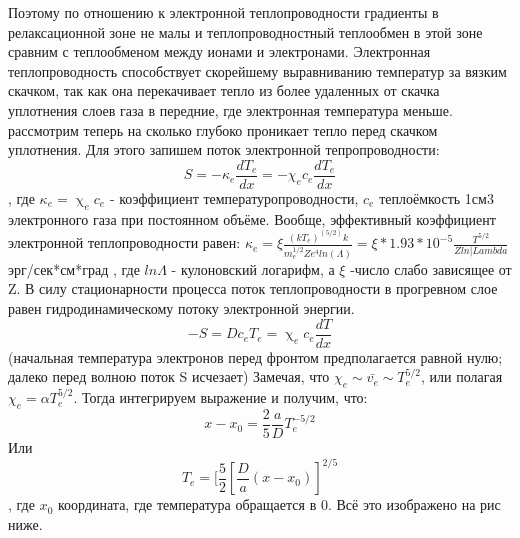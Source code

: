 \documentclass[10pt, a4paper]{article}
\numberwithin{equation}{section}
\begin{document}
Поэтому по отношению к электронной теплопроводности градиенты в релаксационной зоне не малы и теплопроводностный теплообмен в этой зоне сравним с теплообменом между ионами и электронами. Электронная теплопроводность способствует скорейшему выравниванию температур за вязким скачком, так как она перекачивает тепло из более удаленных от скачка уплотнения слоев газа в передние, где электронная температура меньше. 
рассмотрим теперь на сколько глубоко проникает тепло перед скачком уплотнения.
Для этого запишем поток электронной тепропроводности:
\begin{equation}
	S=-\kappa_e \frac{dT_e}{dx}=-\chi_e c_e \frac{dT_e}{dx}
\end{equation}
, где $\kappa_e = \upchi_e c_e$ - коэффициент температуропроводности, $c_e$ теплоёмкость 1см3 электронного газа при постоянном объёме.
Вообще, эффективный коэффициент электронной теплопроводности равен:
$\kappa_e = \xi \frac{(kT_e)^(5/2) k}{m_e^{1/2} Z e^{4} ln(\Lambda)} = \xi *1.93*10^{-5}\frac{T^{5/2}}{Z ln|Lambda} $ эрг/сек*см*град
, где $ln\Lambda$ - кулоновский логарифм, а $\xi$ -число слабо зависящее от Z.
В силу стационарности процесса поток теплопроводности в прогревном слое равен гидродинамическому потоку электронной энергии.
\begin{equation}
	-S= D c_e T_e = \upchi_e c_e \frac{dT}{dx}
\end{equation}
(начальная температура электронов перед фронтом предполагается равной нулю; далеко перед волною поток S исчезает)
Замечая, что $\chi_e \sim \bar{v_e} \sim T_e^{5/2} $, или полагая $\chi_e=\alpha T_e^{5/2}$. Тогда интегрируем выражение и получим, что:
\begin{equation}
	x-x_0 = \frac{2}{5} \frac{a}{D} T_e^{-5/2}
\end{equation}
Или 
\begin{equation}
	T_e = [\frac{5}{2} [\frac{D}{a} (x-x_0) ]^{2/5}
\end{equation}
, где $x_0$ координата, где температура обращается в 0. Всё это изображено на рис ниже.

\begin{figure}[h!]
\end{figure}
\end{document}
